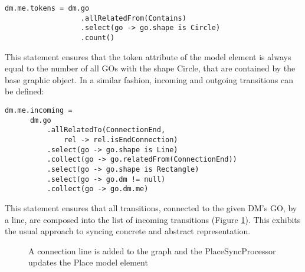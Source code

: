 \begin{lstlisting}[captionpos=b,caption={Rule that syncs the token count of a place element}]
dm.me.tokens = dm.go
                  .allRelatedFrom(Contains)
                  .select(go -> go.shape is Circle)
                  .count()
\end{lstlisting}

This statement ensures that the token attribute of the model element is always equal to the number of all GOs with the shape Circle, that are contained by the base graphic object. In a similar fashion, incoming and outgoing transitions can be defined:
\begin{lstlisting}[captionpos=b,caption={Rule that syncs incoming transitions of a place element},label={lst:incoming-transitions}]
dm.me.incoming = 
      dm.go
          .allRelatedTo(ConnectionEnd,
              rel -> rel.isEndConnection)
          .select(go -> go.shape is Line)
          .collect(go -> go.relatedFrom(ConnectionEnd))
          .select(go -> go.shape is Rectangle)
          .select(go -> go.dm != null)
          .collect(go -> go.dm.me)
\end{lstlisting}

This statement ensures that all transitions, connected to the given DM's GO, by a line, are composed into the list of incoming transitions (Figure \ref{fig:incoming-sync}). This exhibits the usual approach to syncing concrete and abstract representation.


\begin{figure}
  \centering
  
  \caption{A connection line is added to the graph and the PlaceSyncProcessor updates the Place model element}
  \label{fig:incoming-sync}
\end{figure}

